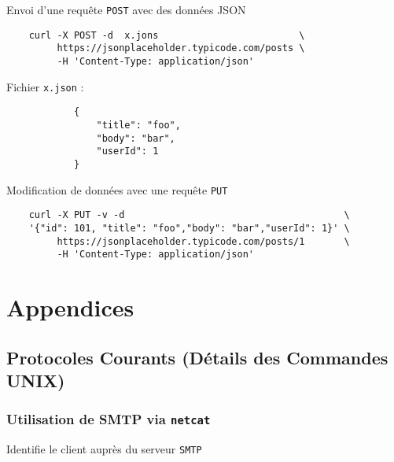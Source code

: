 \documentclass[a4paper]{report}
\begin{document}
    \begin{EExample}{Envoi d'une requête \texttt{POST} avec des données JSON}{} 
        \begin{lstlisting}
    curl -X POST -d  x.jons                         \
         https://jsonplaceholder.typicode.com/posts \
         -H 'Content-Type: application/json'
        \end{lstlisting}
        \fontfamily{lmss}\selectfont Fichier \texttt{x.json} :  
        \begin{lstlisting}
            {
                "title": "foo",
                "body": "bar",
                "userId": 1
            }
        \end{lstlisting}
        \begin{center}
            \hyperlink{Requête POST avec curl}{
            }
        \end{center}
    \end{EExample}

    \begin{EExample}{Modification de données avec une requête \texttt{PUT}}{}
        \begin{lstlisting}
    curl -X PUT -v -d                                       \
    '{"id": 101, "title": "foo","body": "bar","userId": 1}' \
         https://jsonplaceholder.typicode.com/posts/1       \
         -H 'Content-Type: application/json'
        \end{lstlisting}
        \begin{center}
            \hyperlink{Requête PUT avec curl}{
            }
        \end{center}
    \end{EExample}


\backmatter
\chapter{Appendices}
\section{Protocoles Courants (Détails des Commandes UNIX)}%
\selectfont

\subsection{Utilisation de SMTP via \texttt{netcat}}
      Identifie le client auprès du serveur \texttt{SMTP} 
\end{document}
